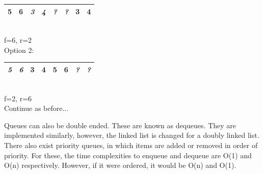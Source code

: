 \documentclass[nobib]{tufte-handout}
\begin{document}
\begin{table}
    \begin{tabular}{|c|c|c|c|c|c|c|c|}
        \hline
        \cellcolor{cyan}\textbf{5} & \cellcolor{cyan}\textbf{6} & \textit{3} & \textit{4} & \textit{?} & \textit{?} & \cellcolor{cyan}\textbf{3} & \cellcolor{cyan}\textbf{4} \\
        \hline
    \end{tabular}\\
    f=6, r=2\\
    Option 2:\\
    \begin{tabular}{|c|c|c|c|c|c|c|c|}
        \hline
        \textit{5} & \textit{6} & \cellcolor{cyan}\textbf{3} & \cellcolor{cyan}\textbf{4} & \cellcolor{cyan}\textbf{5} & \cellcolor{cyan}\textbf{6} & \textit{?} & \textit{?} \\
        \hline
    \end{tabular}\\
    f=2, r=6\\
    Continue as before...
\end{table}
Queues can also be double ended. These are known as dequeues. They are implemented similarly, however, the linked list is changed for a doubly linked list. \\
There also exist priority queues, in which items are added or removed in order of priority. For these, the time complexities to enqueue and dequeue are O(1) and O(n) respectively. However, if it were ordered, it would be O(n) and O(1).\\
\end{document}
